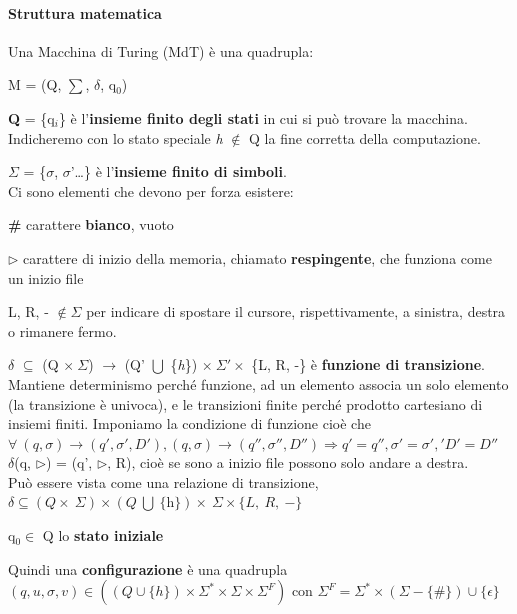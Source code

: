 \documentclass[10pt]{book}
\begin{document}
\paragraph{Struttura matematica} Una Macchina di Turing (MdT) è una quadrupla:
\begin{center}
M = (Q, $\sum$, $\delta$, q$_0$)
\end{center}
\begin{list}{}{}
	\item \textbf{Q} = \{q$_i$\} è l'\textbf{insieme finito degli stati} in cui si può trovare la macchina.\\
	Indicheremo con lo stato speciale \textit{h} $\not\in$ Q la fine corretta della computazione.
	\item $\Sigma$ = \{$\sigma$, $\sigma$'\ldots\} è l'\textbf{insieme finito di simboli}.\\
	Ci sono elementi che devono per forza esistere:
	\begin{list}{}{}
		\item \textbf{\#} carattere \textbf{bianco}, vuoto
		\item $\triangleright$ carattere di inizio della memoria, chiamato \textbf{respingente}, che funziona come un inizio file
		\item L, R, - $\not\in\Sigma$ per indicare di spostare il cursore, rispettivamente, a sinistra, destra o rimanere fermo.
	\end{list}
	\item $\delta$ $\subseteq$ (Q $\times\: \Sigma$) $\rightarrow$ (Q' $\bigcup$ \{\textit{h}\}) $\times\:\Sigma' \times$ \{L, R, -\} è \textbf{funzione di transizione}.\\
	Mantiene determinismo perché funzione, ad un elemento associa un solo elemento (la transizione è univoca), e le transizioni finite perché prodotto cartesiano di insiemi finiti. Imponiamo la condizione di funzione cioè che $\forall\:(q, \sigma)\rightarrow (q', \sigma', D'), (q, \sigma)\rightarrow (q'', \sigma'', D'')\Rightarrow q'=q'', \sigma'=\sigma',' D'=D''$\\
$\delta$(q, $\triangleright$) = (q', $\triangleright$, R), cioè se sono a inizio file possono solo andare a destra.\\
Può essere vista come una relazione di transizione, $\delta \subseteq (Q \times\:\Sigma) \times (Q\:\bigcup\:\{\textit{h}\}) \times\:\Sigma \times \{L,\:R,\: -\}$
	\item q$_0 \in $ Q lo \textbf{stato iniziale} 
\end{list}
Quindi una \textbf{configurazione} è una quadrupla $(q, u, \sigma, v)\in((Q\cup\{h\})\times \Sigma^*\times\Sigma\times\Sigma^F)$ con $\Sigma^F = \Sigma^*\times(\Sigma - \{\#\})\cup\{\epsilon\}$\\
\end{document}

